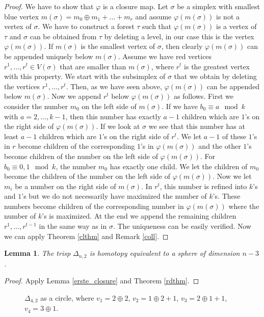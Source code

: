 \documentclass{elsarticle}
\newtheorem{lem}[df]{Lemma}
\begin{document}
\begin{proof}
We have to show that $\varphi$ is a closure map. Let $\sigma$ be a simplex with smallest blue vertex $m(\sigma)=m_0\oplus m_1+\dots+m_r$ and assume $\varphi(m(\sigma))$ is not a vertex of $\sigma$. We have to construct a forest $\tau$ such that $\varphi(m(\sigma))$ is a vertex of $\tau$ and $\sigma$ can be obtained from $\tau$ by deleting a level, in our case this is the vertex $\varphi(m(\sigma))$. If $m(\sigma)$ is the smallest vertex of $\sigma$, then clearly $\varphi(m(\sigma))$ can be appended uniquely below $m(\sigma)$. Assume we have red vertices $r^1,\dots,r^t\in V(\sigma)$ that are smaller than $m(\sigma)$, where $r^t$ is the greatest vertex with this property. We start with the subsimplex of $\sigma$ that we obtain by deleting the vertices $r^1,\dots,r^t$. Then, as we have seen above, $\varphi(m(\sigma))$ can be appended below $m(\sigma)$. Now we append $r^t$ below $\varphi(m(\sigma))$ as follows. First we consider the number $m_0$ on the left side of $m(\sigma)$. If we have $b_0\equiv a\mod k$ with $a=2,\dots,k-1$, then this number has exactly $a-1$ children which are $1$'s on the right side of $\varphi(m(\sigma))$. If we look at $\sigma$ we see that this number has at least $a-1$ children which are $1$'s on the right side of $r^t$. We let $a-1$ of these $1$'s in $r$ become children of the corresponding $1$'s in $\varphi(m(\sigma))$ and the other $1$'s become children of the number on the left side of $\varphi(m(\sigma))$. For $b_0\equiv 0,1\mod k$, the number $m_0$ has exactly one child. We let the children of $m_0$ become the children of the number on the left side of $\varphi(m(\sigma))$. Now we let $m_i$ be a number on the right side of $m(\sigma)$. In $r^t$, this number is refined into $k$'s and $1$'s but we do not necessarily have maximized the number of $k$'s. These numbers become children of the corresponding number in $\varphi(m(\sigma))$ where the number of $k$'s is maximized. At the end we append the remaining children $r^1,\dots,r^{t-1}$ in the same way as in $\sigma$. The uniqueness can be easily verified. Now we can apply Theorem \ref{clthm} and Remark \ref{coll}.
\end{proof}
\begin{lem}
\label{rdanwendung}
The trisp $\Delta_{n,2}$ is homotopy equivalent to a sphere of dimension $n-3$.
\end{lem}
\begin{proof}
Apply Lemma \ref{erste_closure} and Theorem \ref{rdthm}.
\end{proof}
\begin{figure}[ht]
\centering

\caption{$\Delta_{4,2}$ as a circle, where $v_1=2\oplus2$, $v_2=1\oplus 2+1$, $v_3=2\oplus 1 +1$, $v_4=3\oplus 1$.}
\end{figure}
\end{document}
